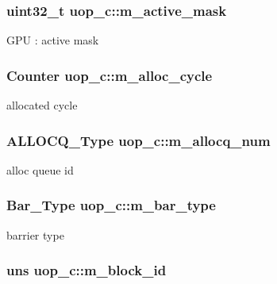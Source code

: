 \hypertarget{classuop__c_a5f8b37c3d7a3b5c8255ab8990cacc93f}{
\subsubsection[{m\_\-active\_\-mask}]{\setlength{\rightskip}{0pt plus 5cm}uint32\_\-t {\bf uop\_\-c::m\_\-active\_\-mask}}}
\label{classuop__c_a5f8b37c3d7a3b5c8255ab8990cacc93f}
GPU : active mask \hypertarget{classuop__c_a36cecb19758b40693067ccf51f600184}{
\subsubsection[{m\_\-alloc\_\-cycle}]{\setlength{\rightskip}{0pt plus 5cm}Counter {\bf uop\_\-c::m\_\-alloc\_\-cycle}}}
\label{classuop__c_a36cecb19758b40693067ccf51f600184}
allocated cycle \hypertarget{classuop__c_a26f48f0600b751f4cafb812ca59acb23}{
\subsubsection[{m\_\-allocq\_\-num}]{\setlength{\rightskip}{0pt plus 5cm}ALLOCQ\_\-Type {\bf uop\_\-c::m\_\-allocq\_\-num}}}
\label{classuop__c_a26f48f0600b751f4cafb812ca59acb23}
alloc queue id \hypertarget{classuop__c_ad954f77ae60ce234817968e983ee713b}{
\subsubsection[{m\_\-bar\_\-type}]{\setlength{\rightskip}{0pt plus 5cm}Bar\_\-Type {\bf uop\_\-c::m\_\-bar\_\-type}}}
\label{classuop__c_ad954f77ae60ce234817968e983ee713b}
barrier type \hypertarget{classuop__c_a8d223e8fbd540bc687ad2243aa4ec2a2}{
\subsubsection[{m\_\-block\_\-id}]{\setlength{\rightskip}{0pt plus 5cm}uns {\bf uop\_\-c::m\_\-block\_\-id}}}
